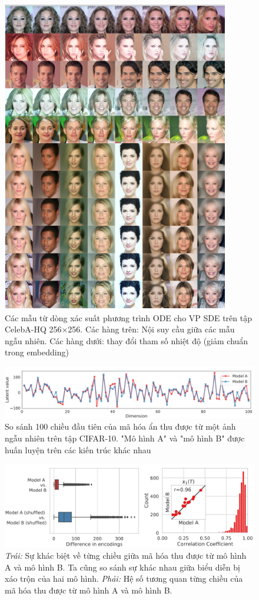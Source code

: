 \documentclass{article} %
\begin{document}
\begin{figure}[h!]
    \centering
    \includegraphics[height=0.7\textheight]{figures/6.png}
    \caption{Các mẫu từ dòng xác suất phương trình ODE cho VP SDE trên tập CelebA-HQ 256$\times$256.
    Các hàng trên: Nội suy cầu giữa các mẫu ngẫu nhiên.
    Các hàng dưới: thay đổi tham số nhiệt độ (giảm chuẩn trong embedding)}
    \label{fig:6}
\end{figure}

\begin{figure}[h!]
    \centering
    \includegraphics[width=0.8\linewidth]{figures/7.png}
    \caption{So sánh 100 chiều đầu tiên của mã hóa ẩn thu được từ một ảnh ngẫu nhiên trên tập CIFAR-10.
    "Mô hình A" và "mô hình B" được huấn luyện trên các kiến trúc khác nhau}
    \label{fig:7}
\end{figure}

\begin{figure}[h!]
    \centering
    \includegraphics[width=0.8\linewidth]{figures/8.png}
    \caption{\textit{Trái:} Sự khác biệt về từng chiều giữa mã hóa thu được từ mô hình A và mô hình B.
    Ta cũng so sánh sự khác nhau giữa biểu diễn bị xáo trộn của hai mô hình.
    \textit{Phải:} Hệ số tương quan từng chiều của mã hóa thu được từ mô hình A và mô hình B.}
    \label{fig:8}
\end{figure}
\end{document}

